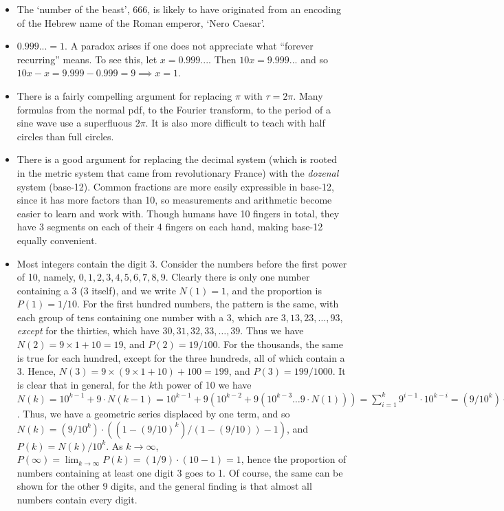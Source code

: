\documentclass[11pt]{amsart}
\begin{document}
\begin{itemize}
\item The `number of the beast', 666, is likely to have originated from an encoding of the Hebrew name of the Roman emperor, `Nero Caesar'.
\item $0.999... = 1$. A paradox arises if one does not appreciate what ``forever recurring'' means. To see this, let $x = 0.999...$. Then $10x = 9.999...$ and so $10x - x = 9.999 - 0.999 = 9 \implies x = 1$.
\item There is a fairly compelling argument for replacing $\pi$ with $\tau = 2\pi$. Many formulas from the normal pdf, to the Fourier transform, to the period of a sine wave use a superfluous $2\pi$. It is also more difficult to teach with half circles than full circles.
\item There is a good argument for replacing the decimal system (which is rooted in the metric system that came from revolutionary France) with the \emph{dozenal} system (base-12). Common fractions are more easily expressible in base-12, since it has more factors than 10, so measurements and arithmetic become easier to learn and work with. Though humans have 10 fingers in total, they have 3 segments on each of their 4 fingers on each hand, making base-12 equally convenient.
\item Most integers contain the digit 3. Consider the numbers before the first power of 10, namely, $0, 1, 2, 3, 4, 5, 6, 7, 8, 9$. Clearly there is only one number containing a 3 (3 itself), and we write $N(1) = 1$, and the proportion is $P(1) = 1/10$. For the first hundred numbers, the pattern is the same, with each group of tens containing one number with a 3, which are $3, 13, 23, \dots, 93$, \emph{except} for the thirties, which have $30, 31, 32, 33, \dots, 39$. Thus we have $N(2) = 9 \times 1 + 10 = 19$, and $P(2) = 19/100$. For the thousands, the same is true for each hundred, except for the three hundreds, all of which contain a 3. Hence, $N(3) = 9\times(9 \times 1 + 10) + 100 = 199$, and $P(3) = 199/1000$. It is clear that in general, for the $k$th power of 10 we have $N(k) = 10^{k-1} + 9\cdot N(k-1) = 10^{k-1} + 9(10^{k-2} + 9(10^{k-3} \dots 9\cdot N(1))) = \sum_{i=1}^{k}9^{i-1}\cdot10^{k-i} = (9/10^k)\cdot\sum_{i=1}^{k}(9/10)^i$. Thus, we have a geometric series displaced by one term, and so $N(k) =  (9/10^k)\cdot((1-(9/10)^k)/(1-(9/10)) - 1)$, and $P(k) = N(k)/10^k$. As $k \to \infty$, $P(\infty) = \lim_{k \to \infty} P(k) = (1/9)\cdot(10 - 1) = 1$, hence the proportion of numbers containing at least one digit 3 goes to 1. Of course, the same can be shown for the other 9 digits, and the general finding is that almost all numbers contain every digit.

\end{itemize}
\end{document}
